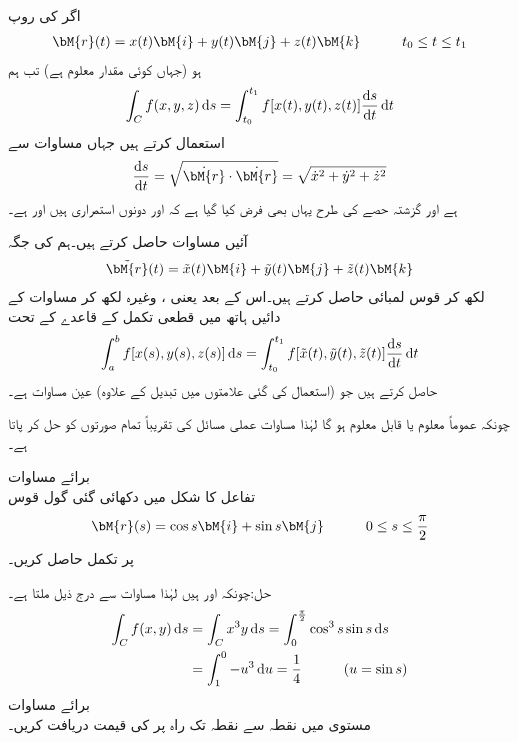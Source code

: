 اگر  کی روپ
\begin{align*}
\bM{r}(t)=x(t)\bM{i}+y(t)\bM{j}+z(t)\bM{k}\quad \quad \quad t_0\le t\le t_1
\end{align*}
ہو (جہاں  کوئی مقدار معلوم ہے) تب ہم 
\begin{align}\label{مساوات_خطی_تکمل_حصول_ب}
\int_C f(x,y,z)\dif s=\int_{t_0}^{t_1} f[x(t),y(t),z(t)]\frac{\dif s}{\dif t}\dif t
\end{align}
استعمال کرتے ہیں جہاں مساوات  سے
\begin{align*}
\frac{\dif s}{\dif t}=\sqrt{\dot{\bM{r}}\cdot \dot{\bM{r}}}=\sqrt{\dot{x}^2+\dot{y}^2+\dot{z}^2}
\end{align*}
ہے اور گزشتہ حصے کی طرح یہاں بھی  فرض کیا گیا ہے  کہ  اور  دونوں استمراری ہیں اور  ہے۔

آئیں مساوات  حاصل کرتے ہیں۔ہم  کی جگہ
\begin{align*}
\tilde{\bM{r}}(t)=\tilde{x}(t)\bM{i}+\tilde{y}(t)\bM{j}+\tilde{z}(t)\bM{k}
\end{align*}
لکھ کر قوس لمبائی  حاصل کرتے ہیں۔اس کے بعد  یعنی ، وغیرہ لکھ کر مساوات  کے دائیں ہاتھ میں قطعی تکمل کے قاعدے کے تحت 
\begin{align*}
\int_a^b f[x(s),y(s),z(s)]\dif s=\int_{t_0}^{t_1} f[\tilde{x}(t),\tilde{y}(t),\tilde{z}(t)]\frac{\dif s}{\dif t}\dif t
\end{align*}
حاصل کرتے ہیں جو (استعمال کی گئی علامتوں میں تبدیل کے علاوہ) عین مساوات  ہے۔

چونکہ عموماً  معلوم یا قابل معلوم ہو گا لہٰذا  مساوات  عملی مسائل کی تقریباً تمام صورتوں کو حل کر پاتا ہے۔

\quad برائے مساوات \\
تفاعل  کا شکل  میں دکھائی گئی گول قوس
\begin{align*}
\bM{r}(s)=\cos s\bM{i}+\sin s\bM{j}\quad \quad \quad 0\le s\le \frac{\pi}{2}
\end{align*}
 پر تکمل حاصل کریں۔

حل:چونکہ  اور  ہیں لہٰذا مساوات  سے درج ذیل ملتا ہے۔
\begin{align*}
\int_C f(x,y)\dif s&=\int_C x^3y\dif s=\int_0^{\frac{\pi}{2}}\cos^3 s\sin s \dif s\\
&=\int_1^{0} -u^3\dif u=\frac{1}{4}\quad \quad \quad (u=\sin s)
\end{align*}
\quad برائے مساوات \\
 مستوی میں نقطہ  سے نقطہ  تک راہ  پر  کی قیمت دریافت کریں۔ 

